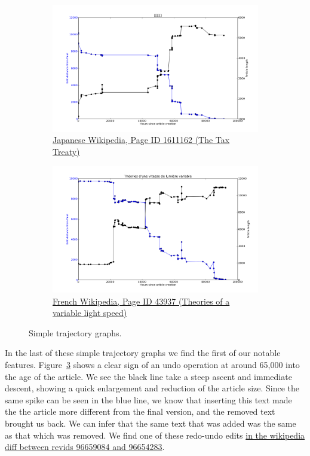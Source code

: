 \begin{figure}
{\begin{subfigure}[b!]{0.6\linewidth}
      \includegraphics[width=\linewidth]{img/traj-classic/ja1611162traj.png}
      \caption{\href{http://ja.wikipedia.org/wiki/index.php?curid=1611162}{Japanese
      Wikipedia, Page ID 1611162 (The Tax Treaty)}}
      \label{fig:japanese-tax}
    \end{subfigure}
    \begin{subfigure}[b!]{0.6\linewidth}
      \centering
      \includegraphics[width=\linewidth]{img/traj-classic/fr43937traj.png}
      \caption{\href{http://fr.wikipedia.org/wiki/index.php?curid=43937}{French
      Wikipedia, Page ID 43937 (Theories of a variable light speed)}}
      \label{fig:variable-light}
    \end{subfigure}
  }
  \caption{Simple trajectory graphs.}
\end{figure}

In the last of these simple trajectory graphs we find the first of our
notable features. Figure~\ref{fig:variable-light} shows a clear sign
of an undo operation at around 65,000 into the age of the article. We
see the black line take a steep ascent and immediate descent, showing
a quick enlargement and reduction of the article size. Since the same
spike can be seen in the blue line, we know that inserting this text
made the the article more different from the final version, and the
removed text brought us back. We can infer that the same text that was
added was the same as that which was removed. We find one of these
redo-undo edits
\href{http://fr.wikipedia.org/w/index.php?title=Th\%C3\%A9ories\_d\%27une\_vitesse\_de\_lumi\%C3\%A8re\_variable&diff=96659084&oldid=96654283}{in
  the wikipedia diff between revids 96659084 and 96654283}.

